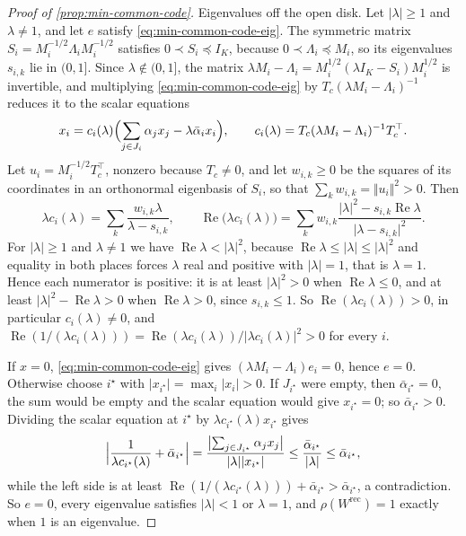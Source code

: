 \begin{proof}[Proof of \cref{prop:min-common-code}]
Eigenvalues off the open disk. Let $\lvert\lambda\rvert\ge1$ and $\lambda\neq1$, and let $e$ satisfy \eqref{eq:min-common-code-eig}. The symmetric matrix $S_i=M_i^{-1/2}\Lambda_iM_i^{-1/2}$ satisfies $0\prec S_i\preceq I_K$, because $0\prec\Lambda_i\preceq M_i$, so its eigenvalues $s_{i,k}$ lie in $(0,1]$. Since $\lambda\notin(0,1]$, the matrix $\lambda M_i-\Lambda_i=M_i^{1/2}(\lambda I_K-S_i)M_i^{1/2}$ is invertible, and multiplying \eqref{eq:min-common-code-eig} by $T_c(\lambda M_i-\Lambda_i)^{-1}$ reduces it to the scalar equations
\[
x_i=c_i(\lambda)\Bigl(\sum_{j\in J_i}\alpha_jx_j-\lambda\bar\alpha_ix_i\Bigr),\qquad c_i(\lambda)=T_c(\lambda M_i-\Lambda_i)^{-1}T_c^\top.
\]
Let $u_i=M_i^{-1/2}T_c^\top$, nonzero because $T_c\neq0$, and let $w_{i,k}\ge0$ be the squares of its coordinates in an orthonormal eigenbasis of $S_i$, so that $\sum_kw_{i,k}=\Vert u_i\Vert^2>0$. Then
\[
\lambda c_i(\lambda)=\sum_k\frac{w_{i,k}\lambda}{\lambda-s_{i,k}},\qquad\operatorname{Re}\bigl(\lambda c_i(\lambda)\bigr)=\sum_kw_{i,k}\frac{\lvert\lambda\rvert^2-s_{i,k}\operatorname{Re}\lambda}{\lvert\lambda-s_{i,k}\rvert^2}.
\]
For $\lvert\lambda\rvert\ge1$ and $\lambda\neq1$ we have $\operatorname{Re}\lambda<\lvert\lambda\rvert^2$, because $\operatorname{Re}\lambda\le\lvert\lambda\rvert\le\lvert\lambda\rvert^2$ and equality in both places forces $\lambda$ real and positive with $\lvert\lambda\rvert=1$, that is $\lambda=1$. Hence each numerator is positive: it is at least $\lvert\lambda\rvert^2>0$ when $\operatorname{Re}\lambda\le0$, and at least $\lvert\lambda\rvert^2-\operatorname{Re}\lambda>0$ when $\operatorname{Re}\lambda>0$, since $s_{i,k}\le1$. So $\operatorname{Re}(\lambda c_i(\lambda))>0$, in particular $c_i(\lambda)\neq0$, and $\operatorname{Re}(1/(\lambda c_i(\lambda)))=\operatorname{Re}(\lambda c_i(\lambda))/\lvert\lambda c_i(\lambda)\rvert^2>0$ for every $i$.

If $x=0$, \eqref{eq:min-common-code-eig} gives $(\lambda M_i-\Lambda_i)e_i=0$, hence $e=0$. Otherwise choose $i^\star$ with $\lvert x_{i^\star}\rvert=\max_i\lvert x_i\rvert>0$. If $J_{i^\star}$ were empty, then $\bar\alpha_{i^\star}=0$, the sum would be empty and the scalar equation would give $x_{i^\star}=0$; so $\bar\alpha_{i^\star}>0$. Dividing the scalar equation at $i^\star$ by $\lambda c_{i^\star}(\lambda)x_{i^\star}$ gives
\[
\Bigl\lvert\frac{1}{\lambda c_{i^\star}(\lambda)}+\bar\alpha_{i^\star}\Bigr\rvert=\frac{\bigl\lvert\sum_{j\in J_{i^\star}}\alpha_jx_j\bigr\rvert}{\lvert\lambda\rvert\lvert x_{i^\star}\rvert}\le\frac{\bar\alpha_{i^\star}}{\lvert\lambda\rvert}\le\bar\alpha_{i^\star},
\]
while the left side is at least $\operatorname{Re}(1/(\lambda c_{i^\star}(\lambda)))+\bar\alpha_{i^\star}>\bar\alpha_{i^\star}$, a contradiction. So $e=0$, every eigenvalue satisfies $\lvert\lambda\rvert<1$ or $\lambda=1$, and $\rho(W^{\mathrm{rec}})=1$ exactly when $1$ is an eigenvalue.


\end{proof}
